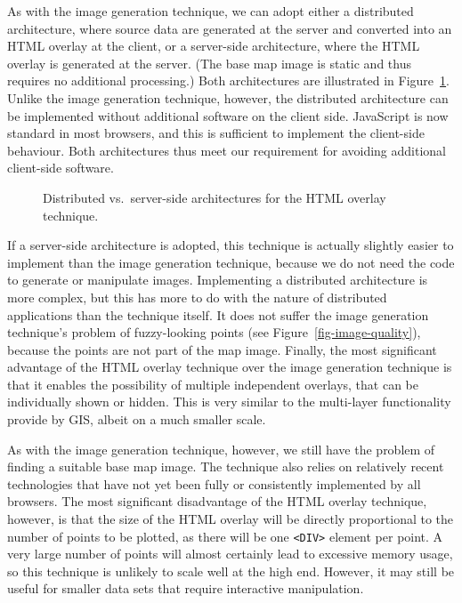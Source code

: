 \documentclass[acmtocl,acmnow]{acmtrans2m}
\begin{document}
As with the image generation technique, we can adopt either a
distributed architecture, where source data are generated at the server
and converted into an HTML overlay at the client, or a server-side
architecture, where the HTML overlay is generated at the server. (The
base map image is static and thus requires no additional processing.)
Both architectures are illustrated in
Figure~\ref{fig-html-architectures}. Unlike the image generation
technique, however, the distributed architecture can be implemented
without additional software on the client side. JavaScript is now
standard in most browsers, and this is sufficient to implement the
client-side behaviour. Both architectures thus meet our requirement for
avoiding additional client-side software.


\begin{figure}
	\caption{Distributed vs.\ server-side architectures for the HTML
	overlay technique.}
	\label{fig-html-architectures}
\end{figure}


If a server-side architecture is adopted, this technique is actually
slightly easier to implement than the image generation technique,
because we do not need the code to generate or manipulate images.
Implementing a distributed architecture is more complex, but this has
more to do with the nature of distributed applications than the
technique itself. It does not suffer the image generation technique's
problem of fuzzy-looking points (see Figure~\ref{fig-image-quality}),
because the points are not part of the map image. Finally, the most
significant advantage of the HTML overlay technique over the image
generation technique is that it enables the possibility of multiple
independent overlays, that can be individually shown or hidden. This is
very similar to the multi-layer functionality provide by GIS, albeit on
a much smaller scale.

As with the image generation technique, however, we still have the
problem of finding a suitable base map image. The technique also relies
on relatively recent technologies that have not yet been fully or
consistently implemented by all browsers. The most significant
disadvantage of the HTML overlay technique, however, is that the size of
the HTML overlay will be directly proportional to the number of points
to be plotted, as there will be one \verb|<DIV>| element per point. A
very large number of points will almost certainly lead to excessive
memory usage, so this technique is unlikely to scale well at the high
end. However, it may still be useful for smaller data sets that require
interactive manipulation.
\end{document}
